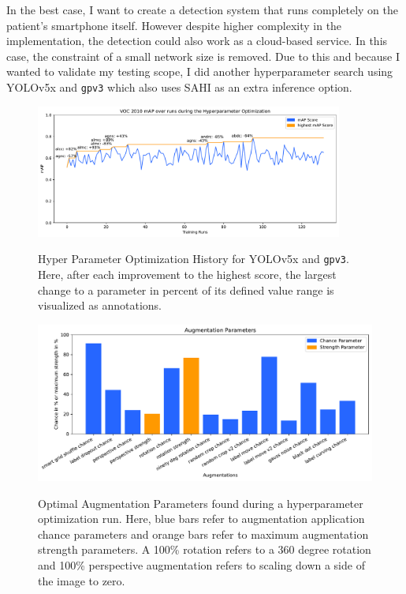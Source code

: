 \documentclass[10pt]{book}
\begin{document}
In the best case, I want to create a detection system that runs completely on the patient's smartphone itself. However despite higher complexity in the implementation, the detection could also work as a cloud-based service. In this case, the constraint of a small network size is removed. Due to this and because I wanted to validate my testing scope, I did another hyperparameter search using \ac{YOLO}v5x and \texttt{gpv3} which also uses \ac{SAHI} as an extra inference option.

\begin{figure}
  \caption{Hyper Parameter Optimization History for \ac{YOLO}v5x and \texttt{gpv3}. Here, after each improvement to the highest score, the largest change to a parameter in percent of its defined value range is visualized as annotations.}
  \includegraphics[width=0.9\textwidth]{image/hyp-param-search-yolov5x_gpv3_hyp_test-history}
  \label{fig:yolov5x_hyp_hist}
\end{figure}

\begin{figure}
  \caption{Optimal Augmentation Parameters found during a hyperparameter optimization run. Here, blue bars
  refer to augmentation application chance parameters and orange bars refer to maximum augmentation strength
  parameters. A 100\% rotation refers to a 360 degree rotation and 100\% perspective augmentation refers to scaling
  down a side of the image to zero.}
  \includegraphics[width=\textwidth]{plot/best_yolov5x_hyp_run_params}
  \label{fig:optimal_yolov5x_augment_params} 
\end{figure}
\end{document}
